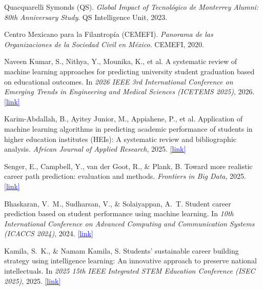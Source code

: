 \documentclass[10pt,twocolumn]{article}
\newcommand{\surl}[1]{\href{#1}{\textcolor{blue}{\small[link]}}}
\begin{document}

\begin{thebibliography}{25}

Quacquarelli Symonds (QS).
\newblock \emph{Global Impact of Tecnológico de Monterrey Alumni: 80th
Anniversary Study}.
\newblock QS Intelligence Unit, 2023.

Centro Mexicano para la Filantropía (CEMEFI).
\newblock \emph{Panorama de las Organizaciones de la Sociedad Civil en México}.
\newblock CEMEFI, 2020.

Naveen Kumar, S., Nithya, Y., Mounika, K., et al.
\newblock A systematic review of machine learning approaches for predicting
university student graduation based on educational outcomes.
\newblock In \emph{2026 IEEE 3rd International Conference on Emerging Trends in
Engineering and Medical Sciences (ICETEMS 2025)}, 2026.
\newblock \surl{https://www.scopus.com/pages/publications/105038020979}

Karim-Abdallah, B., Ayitey Junior, M., Appiahene, P., et al.
\newblock Application of machine learning algorithms in predicting academic
performance of students in higher education institutes (HEIs): A systematic
review and bibliographic analysis.
\newblock \emph{African Journal of Applied Research}, 2025.
\newblock \surl{https://www.scopus.com/pages/publications/85216383596}

Senger, E., Campbell, Y., van der Goot, R., \& Plank, B.
\newblock Toward more realistic career path prediction: evaluation and methods.
\newblock \emph{Frontiers in Big Data}, 2025.
\newblock \surl{https://www.scopus.com/pages/publications/105015219347}

Bhaskaran, V.\ M., Sudharsan, V., \& Solaiyappan, A.\ T.
\newblock Student career prediction based on student performance using machine
learning.
\newblock In \emph{10th International Conference on Advanced Computing and
Communication Systems (ICACCS 2024)}, 2024.
\newblock \surl{https://www.scopus.com/pages/publications/85208635667}

Kamila, S.\ K., \& Namam Kamila, S.
\newblock Students' sustainable career building strategy using intelligence
learning: An innovative approach to preserve national intellectuals.
\newblock In \emph{2025 15th IEEE Integrated STEM Education Conference
(ISEC 2025)}, 2025.
\newblock \surl{https://www.scopus.com/pages/publications/105036380320}


\end{thebibliography}
\end{document}
